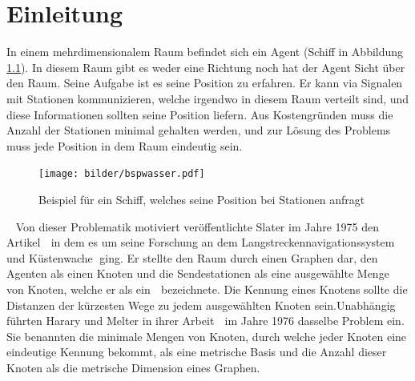 \chapter{Einleitung}
\vspace{-3mm}
In einem mehrdimensionalem Raum befindet sich ein Agent (Schiff in Abbildung \ref{schiff}). In diesem Raum gibt es weder eine Richtung noch hat der Agent Sicht über den Raum. Seine Aufgabe ist es seine Position zu erfahren. Er kann via Signalen mit Stationen kommunizieren, welche irgendwo in diesem Raum verteilt sind, und diese Informationen sollten seine Position liefern. Aus Kostengründen muss die Anzahl der Stationen minimal gehalten werden, und zur Lösung des Problems muss jede Position in dem Raum eindeutig sein.\newline\newline 
\vspace{-14mm}
\newline
\begin{figure}[h]
\centering
\texttt{[image: bilder/bspwasser.pdf]}
\caption{Beispiel für ein Schiff, welches seine Position bei Stationen anfragt}
\label{schiff}
\end{figure}
\vspace{-3mm}
~\linebreak
Von dieser Problematik motiviert veröffentlichte Slater im Jahre 1975 den Artikel \grqq$\;$\cite{slater} in dem es um seine Forschung an dem Langstreckennavigationssystem \grqq$\;$und Küstenwache \grqq$\;$ging. Er stellte den Raum durch einen Graphen dar, den Agenten als einen Knoten und die Sendestationen als eine ausgewählte Menge von Knoten, welche er als ein \grqq$\;$ bezeichnete. Die Kennung eines Knotens sollte  die Distanzen der kürzesten Wege zu jedem ausgewählten Knoten sein.\vspace{-1mm}\newline\newline Unabhängig führten Harary und Melter in ihrer Arbeit \grqq$\;$\cite{harary} im Jahre 1976 dasselbe Problem ein. Sie benannten die minimale Mengen von Knoten, durch welche jeder Knoten eine eindeutige Kennung bekommt, als eine metrische Basis und die Anzahl dieser Knoten als die metrische Dimension eines Graphen.\vspace{-1mm}\newline\newline
